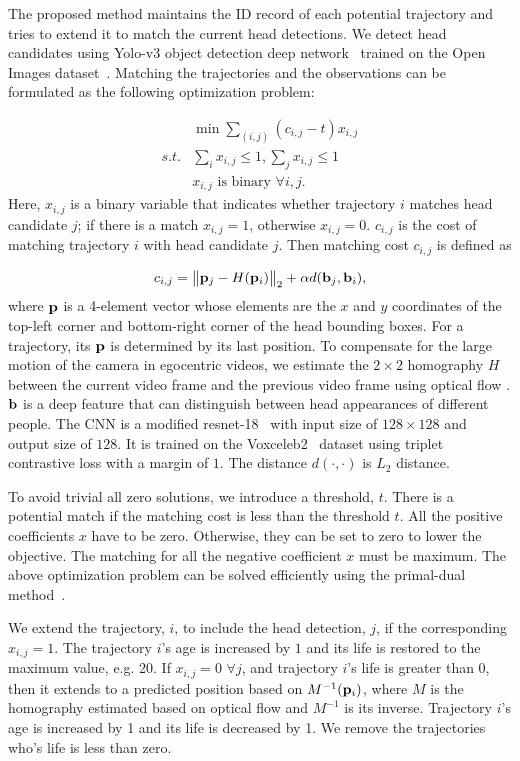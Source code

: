 \documentclass[journal]{IEEEtran}
\newcommand{\norm}[1]{\big\lVert{#1}\big\rVert}
\begin{document}
The proposed method maintains the ID record of each potential trajectory
and tries to extend it to match the current head detections. 
We detect head candidates using Yolo-v3 object detection deep network~\cite{redmon2018yolov3} trained
on the Open Images dataset~\cite{kuznetsova2020open}. Matching the trajectories and the observations
can be formulated as the following optimization problem:

\begin{align*}
& \min\sum_{(i,j)}(c_{i,j}-t)x_{i,j}\\
s.t. & \sum_{i}x_{i,j}\leq1,\sum_{j}x_{i,j}\leq1\\
& x_{i,j}\mbox{ is binary }\forall i,j.
\end{align*}
Here, $x_{i,j}$ is a binary variable that indicates whether trajectory
$i$ matches head candidate $j$; if there is a match $x_{i,j}=1$,
otherwise $x_{i,j}=0$. $c_{i,j}$ is the cost of matching trajectory
$i$ with head candidate $j$. Then matching cost $c_{i,j}$ is defined
as

\[
c_{i,j}=\norm{{\bf p}_{j}-H({\bf p}_{i})}_2+\alpha d({\bf b}_{j},{\bf b}_{i}),
\]
where ${\bf p}$ is a 4-element vector whose elements are the $x$
and $y$ coordinates of the top-left corner and bottom-right corner
of the head bounding boxes. For a trajectory, its ${\bf p}$ is determined
by its last position. To compensate for the large motion of the camera
in egocentric videos, we estimate the $2\times2$ homography $H$
between the current video frame and the previous video frame using
optical flow \cite{zach2007duality}. ${\bf b}$ is a deep feature that can distinguish between head
appearances of different people. The CNN is a modified resnet-18~\cite{}
with input size of $128\times128$ and output size of $128$. It is
trained on the Voxceleb2~\cite{chung2018voxceleb2} dataset using triplet contrastive loss with
a margin of $1$. The distance $d(\cdot,\cdot)$ is $L_{2}$ distance. 

To avoid trivial all zero solutions, we introduce a threshold, $t$. There
is a potential match if the matching cost is less than the threshold
$t$. All the positive coefficients $x$ have to be zero. Otherwise,
they can be set to zero to lower the objective. The matching
for all the negative coefficient $x$ must be maximum.
The above optimization problem can be solved efficiently using the
primal-dual method~\cite{papadimitriou1998combinatorial}.

We extend the trajectory, $i$, to include the head detection, $j$, if
the corresponding $x_{i,j}=1$. The trajectory $i$'s age is increased
by $1$ and its life is restored to the maximum value, e.g. 20. If $x_{i,j}=0$
$\forall j$, and trajectory $i$'s life is greater than 0, then it
extends to a predicted position based on $M^{-1}({\bf p}_{i})$, where
$M$ is the homography estimated based on optical flow and $M^{-1}$ is
its inverse. Trajectory $i$'s age is increased by 1 and its life
is decreased by 1. We remove the trajectories who's life is less than
zero.
\end{document}
